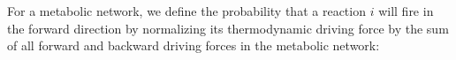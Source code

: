 For a metabolic network, we define the probability that a reaction $i$ will fire in the forward direction  by normalizing its thermodynamic driving force by the sum of all forward and backward driving forces in the metabolic network: